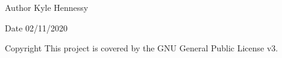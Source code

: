 \begin{DoxyAuthor}{Author}
Kyle Hennessy 
\end{DoxyAuthor}
\begin{DoxyDate}{Date}
02/11/2020 
\end{DoxyDate}
\begin{DoxyCopyright}{Copyright}
This project is covered by the G\+NU General Public License v3. 
\end{DoxyCopyright}

